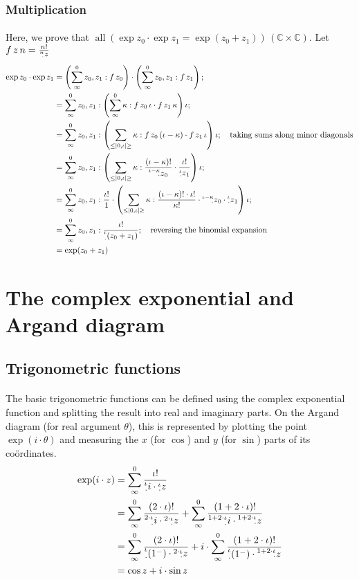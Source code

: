 \documentclass[11pt]{article}
\newcommand*\C{\ensuremath{\mathbb C}}
\newcommand*\id{\iota}
\newcommand*\cd{\cdot}
\newcommand*\prg{\paragraph}
\newcommand*\pt{\prescript}
\DeclareMathOperator{\all}{all}
\begin{document}
\subsubsection{Multiplication}
\prg{}Here, we prove that $\all(\exp z_0\cd\exp z_1=\exp(z_0+z_1))\,(\C\times\C)$. Let $f\,z\,n=\frac{n!}{\pt n\cd z}$
\[
\begin{aligned}
\exp z_0\cd\exp z_1&=\left(\sum^0_\infty z_0,z_1:f\,z_0\right)\cd\left(\sum^0_\infty z_0,z_1:f\,z_1\right); \\
                  &=\sum^0_\infty z_0,z_1:\left(\sum^0_\infty\kappa:f\,z_0\,\id\cd f\,z_1\,\kappa\right)\id; \\
                  &=\sum^0_\infty z_0,z_1:\left(\sum_{{\leq}|0,\id|{\geq}}\kappa:f\,z_0\,(\id-\kappa)\cd f\,z_1\,\id\right)\id;\quad\textrm{taking sums along minor diagonals}\\
                  &=\sum^0_\infty z_0,z_1:\left(\sum_{{\leq}|0,\id|{\geq}}\kappa:\frac{(\id-\kappa)!}{\pt{\id-\kappa}{\cd}z_0}\cd \frac{\id!}{\pt\id\cd z_1}\right)\id; \\
                  &=\sum^0_\infty z_0,z_1:\frac{\id!}{1}\cd\left(\sum_{{\leq}|0,\id|{\geq}}\kappa:\frac{(\id-\kappa)!\cd\id!}{\kappa!}\cd\pt{\id-\kappa}{\cd}z_0\cd\pt\id\cd z_1\right)\id; \\
                  &=\sum^0_\infty z_0,z_1:\frac{\id!}{\pt\id\cd(z_0+z_1)};\quad\textrm{reversing the binomial expansion} \\
                  &=\exp(z_0+z_1)
\end{aligned}
\]

\section{The complex exponential and Argand diagram}
\subsection{Trigonometric functions}
\prg{}The basic trigonometric functions can be defined using the complex exponential function and splitting the result into real and imaginary parts. On the Argand diagram (for real argument $\theta$), this is represented by plotting the point $\exp(i\cd\theta)$ and measuring the $x$ (for $\cos$) and $y$ (for $\sin$) parts of its co\"ordinates.
\[
\begin{aligned}
\exp(i\cd z)&=\sum^0_\infty\frac{\id!}{\pt\id\cd i\cd\pt\id\cd z} \\
&=\sum^0_\infty\frac{(2\cd\id)!}{\pt{2\cd\id}{\cd}i\cd\pt{2\cd\id}{\cd}z}+
  \sum^0_\infty\frac{(1+2\cd\id)!}{\pt{1+2\cd\id}{\cd}i\cd\pt{1+2\cd\id}{\cd}z} \\
&=\sum^0_\infty\frac{(2\cd\id)!}{\pt\id\cd(1^-)\cd\pt{2\cd\id}{\cd}z}+i\cd
  \sum^0_\infty\frac{(1+2\cd\id)!}{\pt\id\cd(1^-)\cd\pt{1+2\cd\id}{\cd}z} \\
&=\cos z+i\cd\sin z
\end{aligned}
\]
\end{document}
